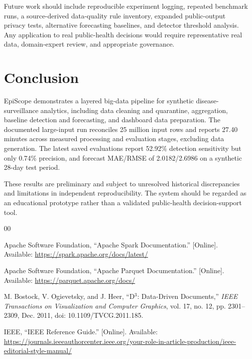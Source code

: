 \documentclass[conference]{IEEEtran}
\begin{document}
Future work should include reproducible experiment logging, repeated benchmark runs, a source-derived data-quality rule inventory, expanded public-output privacy tests, alternative forecasting baselines, and detector threshold analysis. Any application to real public-health decisions would require representative real data, domain-expert review, and appropriate governance.

\section{Conclusion}

EpiScope demonstrates a layered big-data pipeline for synthetic disease-surveillance analytics, including data cleaning and quarantine, aggregation, baseline detection and forecasting, and dashboard data preparation. The documented large-input run reconciles 25 million input rows and reports 27.40 minutes across measured processing and evaluation stages, excluding data generation. The latest saved evaluations report 52.92\% detection sensitivity but only 0.74\% precision, and forecast MAE/RMSE of 2.0182/2.6986 on a synthetic 28-day test period.

These results are preliminary and subject to unresolved historical discrepancies and limitations in independent reproducibility. The system should be regarded as an educational prototype rather than a validated public-health decision-support tool.

\begin{thebibliography}{00}

Apache Software Foundation, ``Apache Spark Documentation.''
[Online]. Available: \url{https://spark.apache.org/docs/latest/}

Apache Software Foundation, ``Apache Parquet Documentation.''
[Online]. Available: \url{https://parquet.apache.org/docs/}

M. Bostock, V. Ogievetsky, and J. Heer, ``D$^3$: Data-Driven Documents,''
\emph{IEEE Transactions on Visualization and Computer Graphics},
vol. 17, no. 12, pp. 2301--2309, Dec. 2011,
doi: 10.1109/TVCG.2011.185.

IEEE, ``IEEE Reference Guide.'' [Online]. Available:
\url{https://journals.ieeeauthorcenter.ieee.org/your-role-in-article-production/ieee-editorial-style-manual/}

\end{thebibliography}

\appendices

\end{document}
